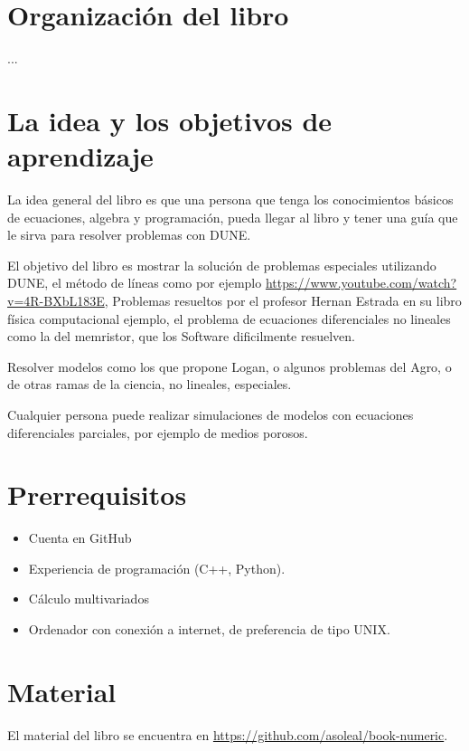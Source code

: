 \section*{Organización del libro}

...

\section*{La idea y los objetivos de aprendizaje}

La idea general del libro es que una persona que tenga los conocimientos básicos
de ecuaciones, algebra y programación, pueda llegar al libro y tener una 
guía que le sirva para resolver problemas con DUNE.

El objetivo del libro es mostrar la solución de problemas especiales utilizando DUNE, 
el método de líneas como por ejemplo \url{https://www.youtube.com/watch?v=4R-BXbL183E},
Problemas resueltos por el profesor Hernan Estrada en su libro física computacional ejemplo,
el problema de ecuaciones diferenciales no lineales como la del memristor, que los 
Software dificilmente resuelven.

Resolver modelos como los que propone Logan, o algunos problemas del Agro, o de otras 
ramas de la ciencia, no lineales, especiales.

Cualquier persona puede realizar simulaciones de modelos con ecuaciones diferenciales parciales, por ejemplo de medios porosos.

\section*{Prerrequisitos}

\begin{itemize}
	\item Cuenta en GitHub
	\item Experiencia de programación (C++, Python).
	\item Cálculo multivariados
	\item Ordenador con conexión a internet, de preferencia de tipo UNIX.
\end{itemize}

\section*{Material}


El material del libro se encuentra en \url{https://github.com/asoleal/book-numeric}.

